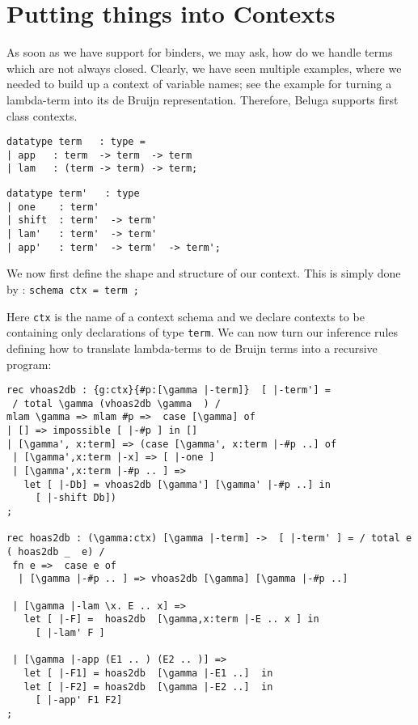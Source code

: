 \section*{Putting things into Contexts} As soon as we have support for binders,
we may ask, how do we handle terms which are not always
closed. Clearly, we have seen multiple examples, where we needed to
build up a context of variable names; see the example for turning a
lambda-term into its de Bruijn representation.
%
Therefore, Beluga supports first class contexts.

\begin{minipage}[t]{7cm}
\begin{lstlisting}
datatype term   : type =
| app   : term  -> term  -> term
| lam   : (term -> term) -> term;    
  \end{lstlisting}
\end{minipage}
\begin{minipage}[t]{7cm}
\begin{lstlisting}
datatype term'   : type
| one    : term' 
| shift  : term'  -> term'  
| lam'   : term'  -> term' 
| app'   : term'  -> term'  -> term';  
\end{lstlisting}  
\end{minipage}

We now first define the shape and structure of our context. This is
simply done by : \lstinline!schema ctx = term ; !


Here \lstinline!ctx! is the name of a context schema and we declare
contexts to be containing only declarations of type \lstinline!term!.
We can now turn our inference rules defining how to translate
lambda-terms to de Bruijn terms into a recursive program:


\begin{lstlisting}
rec vhoas2db : {g:ctx}{#p:[\gamma |-term]}  [ |-term'] =    
 / total \gamma (vhoas2db \gamma  ) /
mlam \gamma => mlam #p =>  case [\gamma] of 
| [] => impossible [ |-#p ] in []
| [\gamma', x:term] => (case [\gamma', x:term |-#p ..] of 
 | [\gamma',x:term |-x] => [ |-one ]
 | [\gamma',x:term |-#p .. ] =>
   let [ |-Db] = vhoas2db [\gamma'] [\gamma' |-#p ..] in
     [ |-shift Db])
;

rec hoas2db : (\gamma:ctx) [\gamma |-term] ->  [ |-term' ] = / total e ( hoas2db _  e) /
 fn e =>  case e of
  | [\gamma |-#p .. ] => vhoas2db [\gamma] [\gamma |-#p ..]

 | [\gamma |-lam \x. E .. x] =>
   let [ |-F] =  hoas2db  [\gamma,x:term |-E .. x ] in
     [ |-lam' F ]

 | [\gamma |-app (E1 .. ) (E2 .. )] =>
   let [ |-F1] = hoas2db  [\gamma |-E1 ..]  in
   let [ |-F2] = hoas2db  [\gamma |-E2 ..]  in
     [ |-app' F1 F2]
;
\end{lstlisting}

